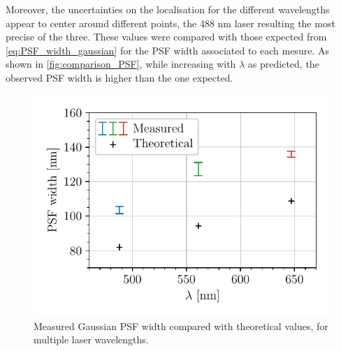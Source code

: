 %
Moreover, the uncertainties on the localisation for the different wavelengths appear to center around different points, the 488 nm laser resulting the most precise of the three.
These values were compared with those expected from \autoref{eq:PSF_width_gaussian} for the PSF width associated to each mesure.
As shown in \autoref{fig:comparison_PSF}, while increasing with $\lambda$ as predicted,
the observed PSF width is higher than the one expected.
\begin{figure}[htbp]
    \centering
    \vspace{-0.5cm}
    \includegraphics[scale=1]{figures/comparison_PSF.pdf}
    \caption{Measured Gaussian PSF width compared with theoretical values, for multiple laser wavelengths.}
    \label{fig:comparison_PSF}
\end{figure}


